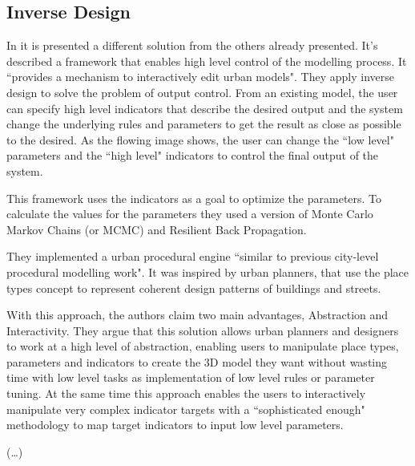 
\subsection{Inverse Design} %
\label{sub:inverse_design}


In \cite{Vanegas2009} it is presented a different solution from the others already presented.
It's described a framework that enables high level control of the modelling process. It ``provides a mechanism to interactively edit urban models". They apply inverse design to solve the problem of output control. From an existing model, the user can specify high level indicators that describe the desired output and the system change the underlying rules and parameters to get the result as close as possible to the desired.
As the flowing image shows, the user can change the ``low level" parameters and the ``high level" indicators to control the final output of the system.


This framework uses the indicators as a goal to optimize the parameters. To calculate the values for the parameters they used a version of Monte Carlo Markov Chains (or MCMC) and Resilient Back Propagation.


They implemented a urban procedural engine ``similar to previous city-level procedural modelling work". It was inspired by urban planners, that use the place types concept to represent coherent design patterns of buildings and streets. 

With this approach, the authors claim two main advantages, Abstraction and Interactivity. They argue that this solution allows urban planners and designers to work at a high level of abstraction, enabling users to manipulate place types, parameters and indicators to create the 3D model they want without wasting time with low level tasks as implementation of low level rules or parameter tuning.
At the same time this approach enables the users to interactively manipulate very complex indicator targets with a ``sophisticated enough" methodology to map target indicators to input low level parameters.

(\dots)

